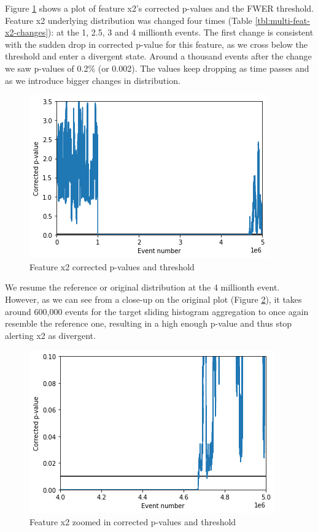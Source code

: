 Figure \ref{fig:x2-corrected-pvalues} shows a plot of feature x2's corrected p-values and the FWER threshold. Feature x2 underlying distribution was changed four times (Table \ref{tbl:multi-feat-x2-changes}): at the 1, 2.5, 3 and 4 millionth events. The first change is consistent with the sudden drop in corrected p-value for this feature, as we cross below the threshold and enter a divergent state. Around a thousand events after the change we saw p-values of 0.2\% (or 0.002). The values keep dropping as time passes and as we introduce bigger changes in distribution.
\begin{figure}[!htb]
    \begin{center}
      \includegraphics[scale=0.8]{figures/x2-corrected-pvalues.png}
      \caption{Feature x2 corrected p-values and threshold}
      \label{fig:x2-corrected-pvalues}
    \end{center}
\end{figure}
We resume the reference or original distribution at the 4 millionth event. However, as we can see from a close-up on the original plot (Figure \ref{fig:x2-corrected-pvalues-zoom}), it takes around 600,000 events for the target sliding histogram aggregation to once again resemble the reference one, resulting in a high enough p-value and thus stop alerting x2 as divergent.
\begin{figure}[!htb]
    \begin{center}
      \includegraphics[scale=0.8]{figures/x2-corrected-pvalues-zoom2.png}
      \caption{Feature x2 zoomed in corrected p-values and threshold}
      \label{fig:x2-corrected-pvalues-zoom}
    \end{center}
\end{figure}


